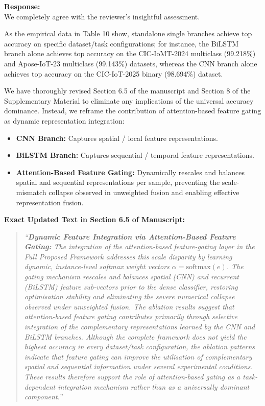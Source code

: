 \documentclass[11pt]{article}
\newcommand{\response}[1]{
  \noindent
  \textbf{Response:} \\
  #1
  \vspace{1.5em}
}
\begin{document}
\response{We completely agree with the reviewer's insightful assessment. 

As the empirical data in Table 10 show, standalone single branches achieve top accuracy on specific dataset/task configurations; for instance, the BiLSTM branch alone achieves top accuracy on the CIC-IoMT-2024 multiclass (99.218\%) and Apose-IoT-23 multiclass (99.143\%) datasets, whereas the CNN branch alone achieves top accuracy on the CIC-IoT-2025 binary (98.694\%) dataset. 

We have thoroughly revised Section 6.5 of the manuscript and Section 8 of the Supplementary Material to eliminate any implications of the universal accuracy dominance. Instead, we reframe the contribution of attention-based feature gating as dynamic representation integration:
\begin{itemize}
    \item \textbf{CNN Branch:} Captures spatial / local feature representations.
    \item \textbf{BiLSTM Branch:} Captures sequential / temporal feature representations.
    \item \textbf{Attention-Based Feature Gating:} Dynamically rescales and balances spatial and sequential representations per sample, preventing the scale-mismatch collapse observed in unweighted fusion and enabling effective representation fusion.
\end{itemize}

\vspace{0.5em}
\noindent\textbf{Exact Updated Text in Section 6.5 of Manuscript:}
\begin{quote}
\textit{``\textbf{Dynamic Feature Integration via Attention-Based Feature Gating:} The integration of the attention-based feature-gating layer in the \textit{Full Proposed Framework} addresses this scale disparity by learning dynamic, instance-level softmax weight vectors $\alpha = \text{softmax}(e)$. The gating mechanism rescales and balances spatial (CNN) and recurrent (BiLSTM) feature sub-vectors prior to the dense classifier, restoring optimisation stability and eliminating the severe numerical collapse observed under unweighted fusion. The ablation results suggest that attention-based feature gating contributes primarily through selective integration of the complementary representations learned by the CNN and BiLSTM branches. Although the complete framework does not yield the highest accuracy in every dataset/task configuration, the ablation patterns indicate that feature gating can improve the utilisation of complementary spatial and sequential information under several experimental conditions. These results therefore support the role of attention-based gating as a task-dependent integration mechanism rather than as a universally dominant component.''}
\end{quote}
}
\end{document}
